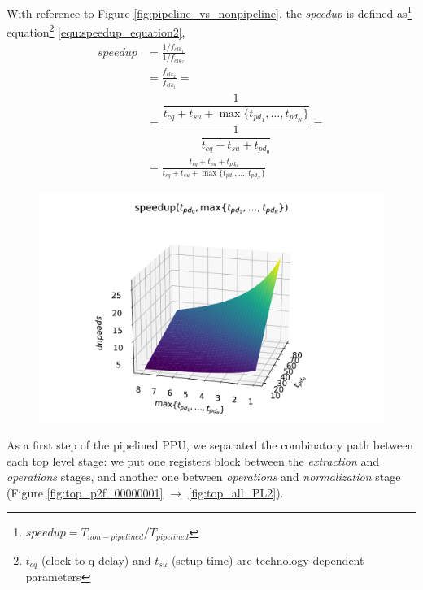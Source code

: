 With reference to Figure \ref{fig:pipeline_vs_nonpipeline}, the \textit{speedup} is defined as\footnote{\cite{lilja_pipelining_2004} $speedup = T_{non-pipelined}/T_{pipelined}$} equation\footnote{$t_{cq}$ (clock-to-q delay) and $t_{su}$ (setup time) are technology-dependent parameters} \eqref{equ:speedup_equation2},
        \begin{equation}\label{equ:speedup_equation2}
            \begin{aligned}
                speedup &= \frac{1/f_{clk_1}}{1/f_{clk_2}} \\
                &= \frac{f_{clk_2}}{f_{clk_1}} = \\
                &= \dfrac{\dfrac{1}{t_{cq} + t_{su} + \max\{t_{pd_1}, \dots, t_{pd_N} \}}}{\dfrac{1}{t_{cq} + t_{su} + t_{pd_0}}} = \\
                &= \frac{t_{cq} + t_{su} + t_{pd_0}}{t_{cq} + t_{su} + \max\{t_{pd_1}, \dots, t_{pd_N} \}}
            \end{aligned}
        \end{equation}
        \begin{figure}
            \includegraphics[width=1\textwidth]{figures/3d_plot_speedup.pdf}
            \label{fig:speedupplot}
        \end{figure}


As a first step of the pipelined PPU, we separated the combinatory path between each top level stage: we put one registers block between the \textit{extraction} and \textit{operations} stages, and another one between \textit{operations} and \textit{normalization} stage (Figure \ref{fig:top_p2f_00000001}  $\rightarrow$ \ref{fig:top_all_PL2}).

